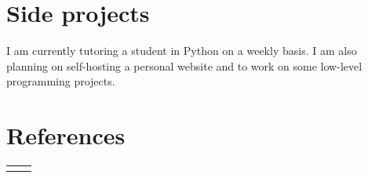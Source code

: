 \documentclass[10pt]{article} %
\begin{document}
\begin{paracol}{2}
\begin{supertabular}{rl}
	
\end{supertabular}


\medskip %

\section{Side projects}


I am currently tutoring a student in Python on a weekly basis. I am also planning on self-hosting a personal website and to work on some low-level programming projects.

\medskip %



\section{References}







\begin{supertabular}{rl} %
	
	


\end{supertabular}
\end{paracol}
\end{document}
